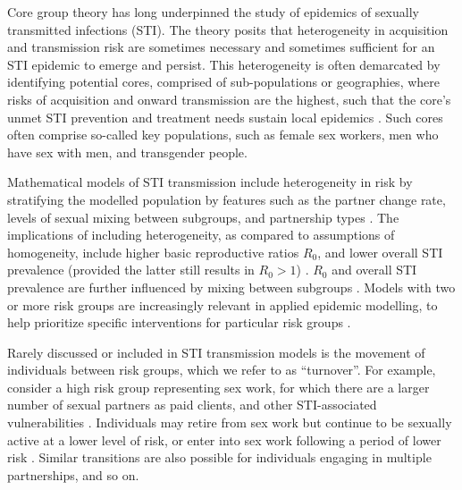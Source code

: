 Core group theory has long underpinned the study of
epidemics of sexually transmitted infections (STI).
The theory posits that heterogeneity in
acquisition and transmission risk are sometimes necessary and sometimes sufficient for
an STI epidemic to emerge and persist.
This heterogeneity is often demarcated by identifying potential cores,
comprised of sub-populations or geographies,
where risks of acquisition and onward transmission are the highest,
such that the core's unmet STI prevention and treatment needs
sustain local epidemics
\citep{Yorke1978,Gesink2011}.
Such cores often comprise so-called key populations, such as
female sex workers,
men who have sex with men,
and transgender people.
\par
Mathematical models of STI transmission include heterogeneity in risk
by stratifying the modelled population by features such as
the partner change rate,
levels of sexual mixing between subgroups, and
partnership types
\citep{Mishra2012}.
The implications of including heterogeneity,
as compared to assumptions of homogeneity, include
higher basic reproductive ratios $R_0$, and
lower overall STI prevalence
(provided the latter still results in $R_0 > 1$)
\citep{Boily1997}.
$R_0$ and overall STI prevalence are further influenced by
mixing between subgroups \citep{Stigum1994,Boily1997}.
Models with two or more risk groups
are increasingly relevant in applied epidemic modelling,
to help prioritize specific interventions for particular risk groups
\citep{Mishra2012}.
\par
Rarely discussed or included in STI transmission models
is the movement of individuals between risk groups,
which we refer to as ``turnover''.
For example, consider a high risk group representing sex work,
for which there are a larger number of sexual partners as paid clients,
and other STI-associated vulnerabilities
\citep{Watts2010}.
Individuals may
retire from sex work but continue to be sexually active at a lower level of risk,
or enter into sex work following a period of lower risk
\citep{Boily2015}.
Similar transitions are also possible for
individuals engaging in multiple partnerships, and so on.
\par
